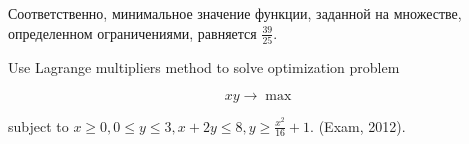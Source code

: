 \begin{solution}

Соответственно, минимальное значение функции, заданной на множестве, определенном ограничениями, равняется  $\frac{39}{25} $.
\end{solution}


\begin{problem}
Use Lagrange multipliers method to solve optimization problem

\[xy\to \max \] 

subject to $x\ge 0,  0\le y\le 3,  x+2y\le 8,  y\ge \frac{x^{2} }{16} +1$. (Exam, 2012).
\end{problem}

